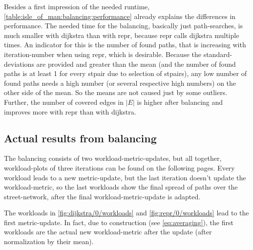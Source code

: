         Besides a first impression of the needed runtime, \vref{table:isle_of_man:balancing:performance} already explains the differences in performance.
        The needed time for the \gls{balancing}, basically just path-searches, is much smaller with \gls{dijkstra} than with \gls{repr}, because \gls{repr} calls \gls{dijkstra} multiple times.
        An indicator for this is the number of found paths, that is increasing with iteration-number when using \gls{repr}, which is desirable.
        Because the standard-deviations are provided and greater than the mean (and the number of found paths is at least 1 for every \gls{stpair} due to selection of \glspl{stpair}), any low number of found paths needs a high number (or several respective high numbers) on the other side of the mean.
        So the means are not caused just by some outliers.
        Further, the number of covered edges in $|E|$ is higher after \gls{balancing} and improves more with \gls{repr} than with \gls{dijkstra}.

    \subsection{Actual results from balancing}

        The \gls{balancing} consists of two workload-\gls{metric}-updates, but all together, workload-plots of three iterations can be found on the following pages.
        Every workload leads to a new \gls{metric}-update, but the last iteration doesn't update the workload-\gls{metric}, so the last workloads show the final spread of paths over the street-network, after the final workload-\gls{metric}-update is adapted.

        The workloads in \cref{fig:dijkstra/0/workloads} and \vref{fig:repr/0/workloads} lead to the first \gls{metric}-update.
        In fact, due to construction (see \vref{eq:averaging}), the first workloads are the actual new workload-\gls{metric} after the update (after normalization by their mean).


